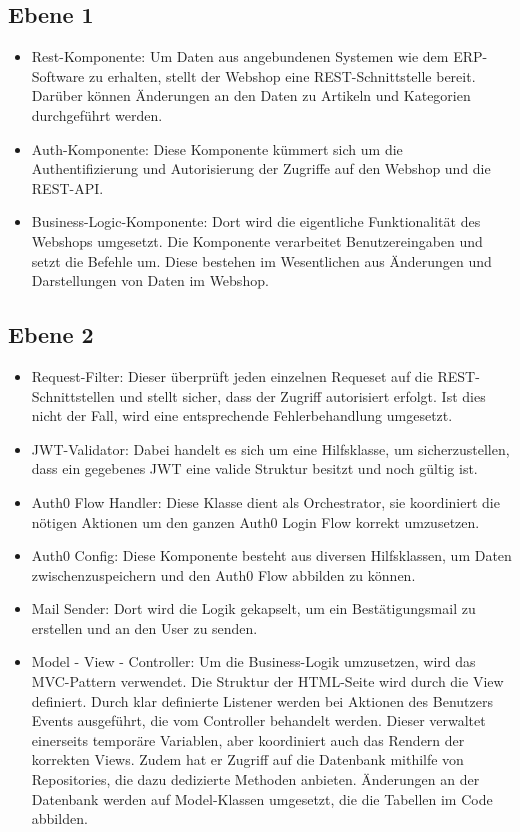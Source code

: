 \documentclass[
]{article}
\begin{document}
\subsection{Ebene 1}
\begin{itemize}
\item Rest-Komponente: Um Daten aus angebundenen Systemen wie dem ERP-Software zu erhalten, stellt der Webshop eine REST-Schnittstelle bereit. Darüber können Änderungen an den Daten zu Artikeln und Kategorien durchgeführt werden.
\item Auth-Komponente: Diese Komponente kümmert sich um die Authentifizierung und Autorisierung der Zugriffe auf den Webshop und die REST-API.
\item Business-Logic-Komponente: Dort wird die eigentliche Funktionalität des Webshops umgesetzt. Die Komponente verarbeitet Benutzereingaben und setzt die Befehle um. Diese bestehen im Wesentlichen aus Änderungen und Darstellungen von Daten im Webshop.
\end{itemize}


\subsection{Ebene 2}
\begin{itemize}
\item Request-Filter: Dieser überprüft jeden einzelnen Requeset auf die REST-Schnittstellen und stellt sicher, dass der Zugriff autorisiert erfolgt. Ist dies nicht der Fall, wird eine entsprechende Fehlerbehandlung umgesetzt.
\item JWT-Validator: Dabei handelt es sich um eine Hilfsklasse, um sicherzustellen, dass ein gegebenes JWT eine valide Struktur besitzt und noch gültig ist.
\item Auth0 Flow Handler: Diese Klasse dient als Orchestrator, sie koordiniert die nötigen Aktionen um den ganzen Auth0 Login Flow korrekt umzusetzen.
\item Auth0 Config: Diese Komponente besteht aus diversen Hilfsklassen, um Daten zwischenzuspeichern und den Auth0 Flow abbilden zu können.
\item Mail Sender: Dort wird die Logik gekapselt, um ein Bestätigungsmail zu erstellen und an den User zu senden.
\item Model - View - Controller: Um die Business-Logik umzusetzen, wird das MVC-Pattern verwendet. Die Struktur der HTML-Seite wird durch die View definiert. Durch klar definierte Listener werden bei Aktionen des Benutzers Events ausgeführt, die vom Controller behandelt werden. Dieser verwaltet einerseits temporäre Variablen, aber koordiniert auch das Rendern der korrekten Views. Zudem hat er Zugriff auf die Datenbank mithilfe von Repositories, die dazu dedizierte Methoden anbieten. Änderungen an der Datenbank werden auf Model-Klassen umgesetzt, die die Tabellen im Code abbilden.
\end{itemize}
\end{document}
